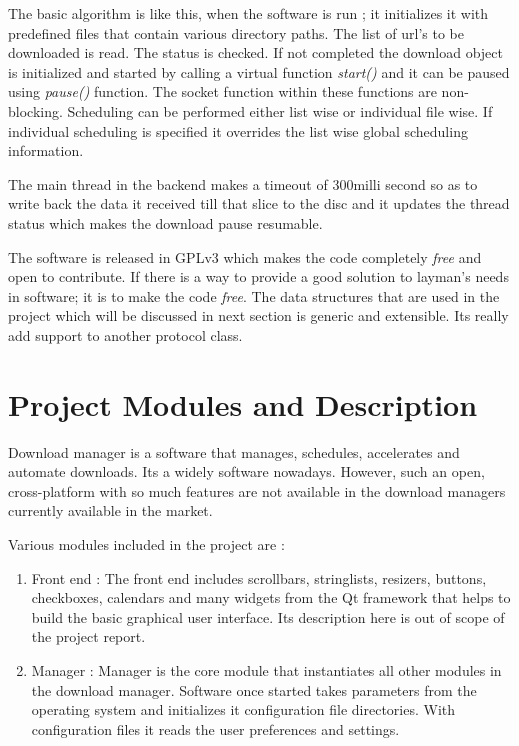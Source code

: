 \documentclass[pdftex,12pt,a4paper,pdfencoding=unicode]{article}
\begin{document}
\begin{onehalfspace}
      The basic algorithm is like this, when the software is run ; it initializes it with predefined files that contain various directory
      paths. The list of url's to be downloaded is read. The status is checked. If not completed the download object is initialized and
      started by calling a virtual function \emph{start()} and it can be paused using \emph{pause()} function. The socket function within
      these functions are non-blocking. Scheduling can be performed either list wise or individual file wise. If individual scheduling is
      specified it overrides the list wise global scheduling information.

      The main thread in the backend makes a timeout of 300milli second so as to write back the data it received till that slice to the
      disc and it updates the thread status which makes the download pause resumable.

      The software is released in GPLv3 which makes the code completely \emph{free} and open to contribute. If there is a way to provide
      a good solution to layman's needs in software; it is to make the code \emph{free}. The data structures that are used in the project
      which will be discussed in next section is generic and extensible. Its really add support to another protocol class.
      \newpage
      \section{Project Modules and Description}
       Download manager is a software that manages, schedules, accelerates and automate downloads. Its a widely software nowadays. However,
       such an open, cross-platform with so much features are not available in the download managers currently available in the market.

       Various modules included in the project are :
       \begin{enumerate}
       \item Front end : The front end includes scrollbars, stringlists, resizers, buttons, checkboxes, calendars and many widgets from
         the Qt framework that helps to build the basic graphical user interface. Its description here is out of scope of the project
         report.
       \item Manager : Manager is the core module that instantiates all other modules in the download manager. Software once started
         takes parameters from the operating system and initializes it configuration file directories. With configuration files it reads the
         user preferences and settings.


\end{enumerate}
\end{onehalfspace}
\end{document}
